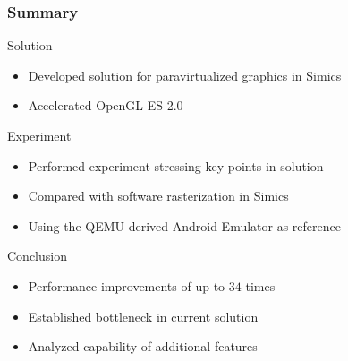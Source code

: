 \begin{frame}
\frametitle{Summary}

\begin{block}{Solution}
	\begin{itemize}
		\item Developed solution for paravirtualized graphics in Simics
		\item Accelerated OpenGL ES 2.0
	\end{itemize}
\end{block}

\begin{block}{Experiment}
	\begin{itemize}
		\item Performed experiment stressing key points in solution
		\item Compared with software rasterization in Simics
		\item Using the QEMU derived Android Emulator as reference
	\end{itemize}
\end{block}

\begin{block}{Conclusion}
	\begin{itemize}
		\item Performance improvements of up to $34$ times
		\item Established bottleneck in current solution
		\item Analyzed capability of additional features
	\end{itemize}
\end{block}

\end{frame}
